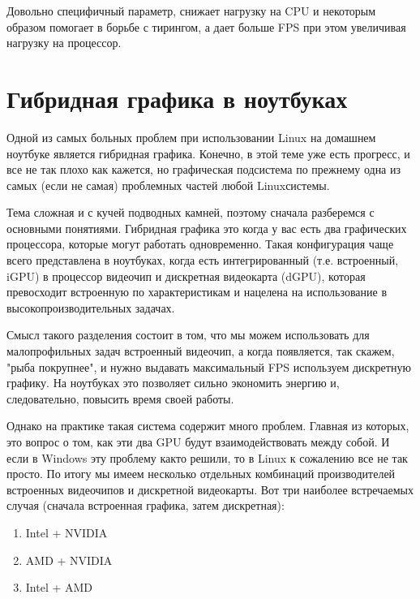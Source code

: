 \documentclass[letterpaper,10pt,russian,openany]{sphinxmanual}
\begin{document}
\sphinxAtStartPar
{}  \sphinxhyphen{} Довольно специфичный параметр,  \sphinxhyphen{} снижает нагрузку на CPU и некоторым образом помогает в борьбе с тирингом,
а  дает больше FPS при этом увеличивая нагрузку на процессор.

\ignorespaces 

\section{Гибридная графика в ноутбуках}
\label{\detokenize{source/first-steps:hybrid-graphics}}\label{\detokenize{source/first-steps:index-14}}\label{\detokenize{source/first-steps:id13}}
\sphinxAtStartPar
Одной из самых больных проблем при использовании Linux на домашнем ноутбуке является гибридная графика.
Конечно, в этой теме уже есть прогресс, и все не так плохо как кажется, но графическая подсистема по
прежнему одна из самых (если не самая) проблемных частей любой Linux\sphinxhyphen{}системы.

\sphinxAtStartPar
Тема сложная и с кучей подводных камней, поэтому сначала разберемся с основными понятиями.
Гибридная графика \sphinxhyphen{} это когда у вас есть два графических процессора, которые могут работать
одновременно. Такая конфигурация чаще всего представлена в ноутбуках, когда есть интегрированный
(т.е. встроенный, iGPU) в процессор видеочип и дискретная видеокарта (dGPU), которая
превосходит встроенную по характеристикам и нацелена на использование в высокопроизводительных
задачах.

\sphinxAtStartPar
Смысл такого разделения состоит в том, что мы можем использовать для малопрофильных задач встроенный видеочип,
а когда появляется, так скажем, "рыба покрупнее", и нужно выдавать максимальный FPS \sphinxhyphen{} используем дискретную графику.
На ноутбуках это позволяет сильно экономить энергию и, следовательно, повысить время своей работы.

\sphinxAtStartPar
Однако на практике такая система содержит много проблем. Главная из которых, это вопрос о том,
как эти два GPU будут взаимодействовать между собой. И если в Windows эту проблему как\sphinxhyphen{}то решили,
то в Linux к сожалению все не так просто. По итогу мы имеем несколько отдельных комбинаций
производителей встроенных видеочипов и дискретной видеокарты. Вот три наиболее встречаемых случая
(сначала встроенная графика, затем дискретная):
\begin{enumerate}
%
\item {} 
\sphinxAtStartPar
Intel + NVIDIA

\item {} 
\sphinxAtStartPar
AMD + NVIDIA

\item {} 
\sphinxAtStartPar
Intel + AMD

\end{enumerate}
\end{document}
